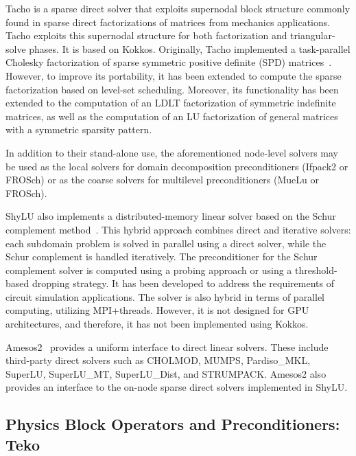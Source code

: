 Tacho is a sparse direct solver that exploits supernodal block structure commonly found in sparse direct factorizations of matrices from mechanics applications. Tacho exploits this supernodal structure for both factorization and triangular-solve phases. It is based on Kokkos. Originally, Tacho implemented a task-parallel Cholesky factorization of sparse symmetric positive definite (SPD) matrices~\cite{Tacho2018}. However, to improve its portability, it has been extended to compute the sparse factorization based on level-set scheduling. Moreover, its functionality has been extended to the computation of an LDLT factorization of symmetric indefinite matrices, as well as the computation of an LU factorization of general matrices with a symmetric sparsity pattern.

In addition to their stand-alone use, the aforementioned node-level solvers may be used as the local solvers for domain decomposition preconditioners (Ifpack2 or FROSch) or as the coarse solvers for multilevel preconditioners (MueLu or FROSch).

ShyLU also implements a distributed-memory linear solver based on the Schur complement method~\cite{ShyLUCore2014}. This hybrid approach combines direct and iterative solvers: each subdomain problem is solved in parallel using a direct solver, while the Schur complement is handled iteratively. The preconditioner for the Schur complement solver is computed using a probing approach or using a threshold-based dropping strategy. It has been developed to address the requirements of circuit simulation applications. The solver is also hybrid in terms of parallel computing, utilizing MPI+threads. However, it is not designed for GPU architectures, and therefore, it has not been implemented using Kokkos. %

Amesos2~\cite{Bavier2012a} provides a uniform interface to direct linear solvers.
These include third-party direct solvers such as CHOLMOD, MUMPS, Pardiso\_MKL, SuperLU, SuperLU\_MT, SuperLU\_Dist, and STRUMPACK.
Amesos2 also provides an interface to the on-node sparse direct solvers implemented in ShyLU.



\subsection{Physics Block Operators and Preconditioners: Teko}
\label{sec:teko}

